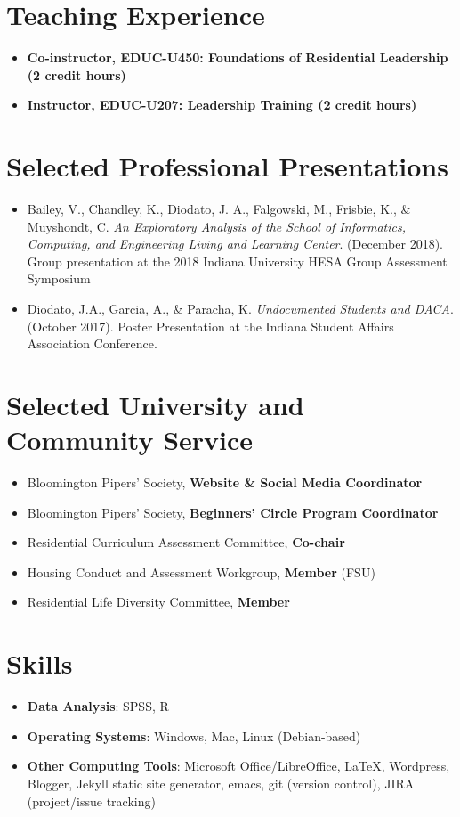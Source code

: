 \documentclass{article}
\begin{document}
\section*{Teaching Experience}
\begin{itemize}
\item \textbf{Co-instructor, EDUC-U450: Foundations of Residential Leadership (2
  credit hours)}
\item \textbf{Instructor, EDUC-U207: Leadership Training (2 credit hours)}
\end{itemize}

\section*{Selected Professional Presentations}
\begin{itemize}
\item Bailey, V., Chandley, K., Diodato, J. A., Falgowski, M., Frisbie, K., \&
  Muyshondt, C. \textit{An Exploratory Analysis of the School of Informatics,
    Computing, and Engineering Living and Learning Center}. (December
  2018). Group presentation at the 2018 Indiana University HESA Group Assessment
  Symposium
\item Diodato, J.A., Garcia, A., \& Paracha, K. \textit{Undocumented Students
    and DACA}. (October 2017). Poster Presentation at the Indiana Student
  Affairs Association Conference.

\end {itemize}

\section*{Selected University and Community Service}
\begin{itemize}
\item Bloomington Pipers' Society, \textbf{Website \& Social Media Coordinator}
\item Bloomington Pipers' Society, \textbf{Beginners' Circle Program Coordinator}
\item Residential Curriculum Assessment Committee, \textbf{Co-chair}
\item Housing Conduct and Assessment Workgroup, \textbf{Member} \tiny(FSU) \normalsize
\item Residential Life Diversity Committee, \textbf{Member}
\end{itemize}

\section*{Skills}
\begin{itemize}
\item \textbf{Data Analysis}: SPSS, R
\item \textbf{Operating Systems}: Windows, Mac, Linux (Debian-based)
\item \textbf{Other Computing Tools}: Microsoft Office/LibreOffice, \LaTeX,
  Wordpress, Blogger, Jekyll static site generator, emacs, git (version
  control), JIRA (project/issue tracking)
\end{itemize}
\end{document}
